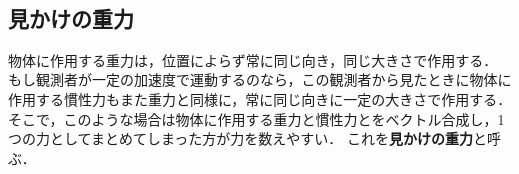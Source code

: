 %

 \ 
 
 \subsection{見かけの重力}
 
 物体に作用する重力は，位置によらず常に同じ向き，同じ大きさで作用する．
 もし観測者が一定の加速度で運動するのなら，この観測者から見たときに物体に作用する慣性力もまた重力と同様に，常に同じ向きに一定の大きさで作用する．
 そこで，このような場合は物体に作用する重力と慣性力とをベクトル合成し，1つの力としてまとめてしまった方が力を数えやすい．
 これを{\bf 見かけの重力}と呼ぶ．
  
  \ 
% 
%

